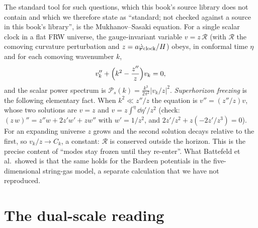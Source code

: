 The standard tool for such questions, which this book's source library does not contain and
which we therefore state as ``standard; not checked against a source in this book's
library'', is the Mukhanov--Sasaki equation. For a single
scalar clock in a flat FRW universe, the gauge-invariant variable $v=z\,\mathcal R$ (with
$\mathcal R$ the comoving curvature perturbation and $z=a\dot\varphi_{\rm clock}/H$) obeys, in
conformal time $\eta$ and for each comoving wavenumber $k$,
\begin{equation}\label{eq:cosmology:MS}
 v_k''+\Bigl(k^2-\frac{z''}{z}\Bigr)v_k=0 ,
\end{equation}
and the scalar power spectrum is $\mathcal P_s(k)=\frac{k^3}{2\pi^2}\bigl|v_k/z\bigr|^2$.
\emph{Superhorizon freezing} is the following elementary fact.
When $k^2\ll z''/z$ the equation is $v''=(z''/z)v$, whose two solutions are $v=z$ and
$v=z\int^\eta\dd\eta'/z^2$ (check: $(z\,w)''=z''w+2z'w'+zw''$ with $w'=1/z^2$, and
$2z'/z^2+z(-2z'/z^3)=0$). For an expanding universe $z$ grows and the second solution
decays relative to the first, so $v_k/z\to C_k$, a constant: $\mathcal R$ is conserved
outside the horizon. This is the precise content of ``modes stay frozen until they
re-enter''. What Battefeld et al.\ showed is that the same holds for the Bardeen
potentials in the five-dimensional string-gas model, a separate
calculation \TL{} that we have not reproduced.

\section{The dual-scale reading}\label{sec:cosmology:dualscale}

